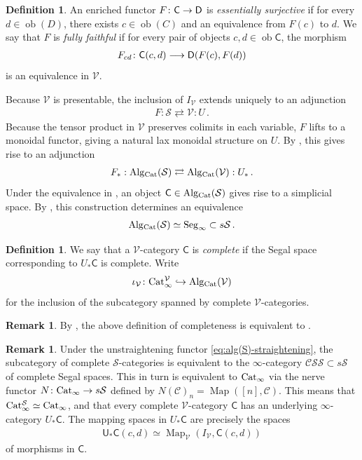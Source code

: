 \documentclass[10pt]{amsart}
\numberwithin{equation}{section}
\theoremstyle{definition}
\newtheorem{definition}[prop]{Definition}
\newtheorem{rem}[prop]{Remark}
\DeclareMathOperator{\Map}{Map}
\DeclareMathOperator{\ob}{ob}
\newcommand{\Cat}{\mathrm{Cat}\vphantom{t}}
\newcommand{\Alg}{\mathrm{Alg}\vphantom{z}}
\newcommand{\cC}{\mathcal{C}}
\newcommand{\cS}{\mathcal{S}}
\newcommand{\cV}{\mathcal{V}}
\newcommand{\sfC}{\mathsf{C}}
\newcommand{\sfD}{\mathsf{D}}
\newcommand{\sfU}{\mathsf{U}}
\newcommand{\CSS}{\mathcal{CSS}}
\newcommand{\Seg}{\mathrm{Seg}_{\infty}}
\renewcommand{\to}{\mathchoice{\longrightarrow}{\rightarrow}{}{}}
\begin{document}
	\begin{definition}\label{def:ess_surj_enriched_functor}
		An enriched functor $F\colon \sfC \to \sfD$  is \emph{essentially surjective} if for every $d\in \ob(D)$, there exists $c\in \ob(C)$ and an equivalence from $F(c)$ to $d$.
		We say that $F$ is \emph{fully faithful} if for every pair of objects $c,d \in \ob{\sfC}$, the morphism
		\begin{align*}
			F_{cd} \colon \sfC(c,d) \to \sfD(F(c), F(d))
		\end{align*}
		is an equivalence in $\cV$.
	\end{definition}

	Because $\cV$ is presentable, the inclusion of $I_{\cV}$ extends uniquely to an adjunction
	\begin{align*}
		F : \cS \rightleftarrows \cV : U \,.
	\end{align*}
	Because the tensor product in $\cV$ preserves colimits in each variable, $F$ lifts to a monoidal functor, giving a natural lax monoidal structure on $U$.
  By \cite*[Example 4.3.20]{GH}, this gives rise to an adjunction
	\begin{align*}
		F_* : \Alg_{\Cat}(\cS) \rightleftarrows \Alg_{\Cat}(\cV) : U_{*} \,.
	\end{align*}
	Under the equivalence in , an object $\sfC\in \Alg_{\Cat}(\cS)$ gives rise to a simplicial space.
  By \cite*[Theorem 4.4.7]{GH}, this construction determines an equivalence
	\begin{align}\label{eq:alg(S)-straightening}
		\Alg_{\Cat}(\cS) \simeq \Seg \subset s\cS \,.
	\end{align}
	\begin{definition} \label{def:complete_algebra}
		We say that a $\cV$-category $\sfC$ is \emph{complete} if the Segal space corresponding to $U_{*}\sfC$ is complete.
		Write
		\begin{align}\label{eq:iota_V}
			\iota_{\cV}\colon \Cat^{\cV}_{\infty} \hookrightarrow \Alg_{\Cat}(\cV)
		\end{align}
		for the inclusion of the subcategory spanned by complete $\cV$-categories.
	\end{definition}
	\begin{rem}\label{rem:completeness}
		By \cite*[Proposition 5.1.11]{GH}, the above definition of completeness is equivalent to \cite*[Definition 5.2.2]{GH}.
	\end{rem}
	\begin{rem}\label{rem:S-categories_are_infty_categories}
		Under the unstraightening functor \eqref{eq:alg(S)-straightening}, the subcategory of complete $\cS$-categories is equivalent to the $\infty$-category $\CSS\subset s\cS$ of complete Segal spaces.
    This in turn is equivalent to $\Cat_{\infty}$ via the nerve functor $N\colon \Cat_{\infty}\to s\cS$ defined by $N(\cC)_{n}= \Map([n],\cC)$.
    This means that $\Cat_{\infty}^{\cS}\simeq \Cat_{\infty}$, and that every complete $\cV$-category $\sfC$ has an underlying $\infty$-category $U_{*}\sfC$.
		The mapping spaces in $U_{*}\sfC$ are precisely the spaces
		\begin{align*}
			\sfU_{*}\sfC(c,d) \simeq \Map_{\cV}(I_{\cV}, \sfC(c,d))
		\end{align*}
		of morphisms in $\sfC$.
	\end{rem}
\end{document}
